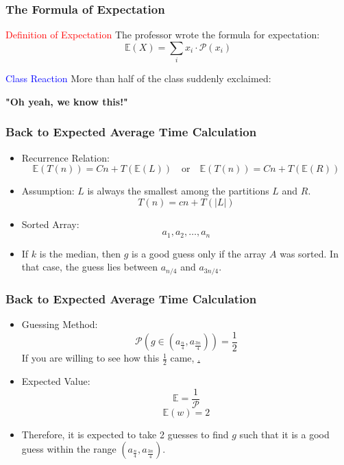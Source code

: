 \begin{frame}
    \frametitle{The Formula of Expectation}
    \vspace{0.3cm}

    \begin{block}{\textcolor{red}{Definition of Expectation}}
        The professor wrote the formula for expectation:
        \[ \mathbb{E}(X) = \sum_{i} x_i \cdot \mathcal{P}(x_i) \]
    \end{block}
    \vspace{0.4cm}

    \begin{block}{\textcolor{blue}{Class Reaction}}
        More than half of the class suddenly exclaimed:
        \begin{center}
            \textbf{"Oh yeah, we know this!"}
        \end{center}
    \end{block}
    \vspace{0.4cm}

\end{frame}

\begin{frame}
    \frametitle{Back to Expected Average Time Calculation}
    \begin{itemize}
        \item Recurrence Relation:
        \[
        \mathbb{E}(T(n)) = Cn + T(\mathbb{E}(L)) \quad \text{or} \quad \mathbb{E}(T(n)) = Cn + T(\mathbb{E}(R))
        \]
        \item Assumption: \(L\) is always the smallest among the partitions \(L\) and \(R\).
        \[
        T(n) = cn + T(|L|)
        \]
        \item Sorted Array:
        \[
        a_1, a_2, \dots, a_n
        \]
        \item If \(k\) is the median, then \(g\) is a good guess only if the array \(A\) was sorted. In that case, the guess lies between \(a_{n/4} \) and \(a_{3n/4}\).
    \end{itemize}
\end{frame}

\begin{frame}
    \frametitle{Back to Expected Average Time Calculation}
    \begin{itemize}
        \item Guessing Method:
        \[
        \mathcal{P}\left(g \in \left(a_{\frac{n}{4}}, a_{\frac{3n}{4}}\right)\right) = \frac{1}{2}
        \]
        If you are willing to see how this \(\frac{1}{2}\) came,    
        \href{https://drive.google.com/file/d/1DqlktCr-hvTREOOm8hhHVSO5Sv6QmoWf/view?usp=sharing}{.}
    
        \item Expected Value:
        \[
        \mathbb{E} = \frac{1}{\mathcal{P}}
        \]
        \[
        \mathbb{E}(w) = 2
        \]
        \item Therefore, it is expected to take 2 guesses to find \(g\) such that it is a good guess within the range \(\left(a_{\frac{n}{4}}, a_{\frac{3n}{4}}\right)\).
    \end{itemize}
\end{frame}


